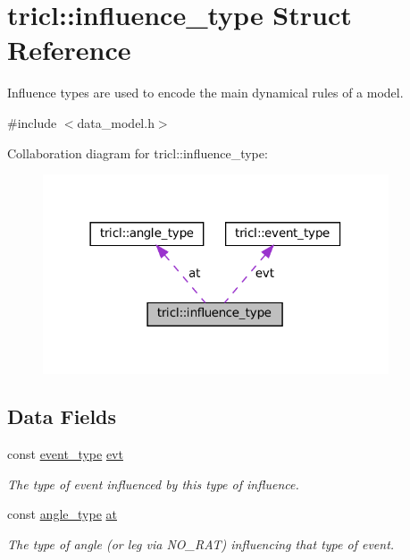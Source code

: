 \hypertarget{structtricl_1_1influence__type}{}\section{tricl\+:\+:influence\+\_\+type Struct Reference}
\label{structtricl_1_1influence__type}


Influence types are used to encode the main dynamical rules of a model.  




{\ttfamily \#include $<$data\+\_\+model.\+h$>$}



Collaboration diagram for tricl\+:\+:influence\+\_\+type\+:
\nopagebreak
\begin{figure}[H]
\begin{center}
\leavevmode
\includegraphics[width=290pt]{d0/dba/structtricl_1_1influence__type__coll__graph}
\end{center}
\end{figure}
\subsection*{Data Fields}
\begin{DoxyCompactItemize}
\item 
\mbox{\label{structtricl_1_1influence__type_a9e3a80224b266e0ff8041644e372fe19}} 
const \hyperlink{structtricl_1_1event__type}{event\+\_\+type} \hyperlink{structtricl_1_1influence__type_a9e3a80224b266e0ff8041644e372fe19}{evt}
\begin{DoxyCompactList}\small\item\em The type of event influenced by this type of influence. \end{DoxyCompactList}\item 
\mbox{\label{structtricl_1_1influence__type_a9d6fecd13fbb3e7b0686556d80b3b537}} 
const \hyperlink{structtricl_1_1angle__type}{angle\+\_\+type} \hyperlink{structtricl_1_1influence__type_a9d6fecd13fbb3e7b0686556d80b3b537}{at}
\begin{DoxyCompactList}\small\item\em The type of angle (or leg via N\+O\+\_\+\+R\+AT) influencing that type of event. \end{DoxyCompactList}\end{DoxyCompactItemize}
